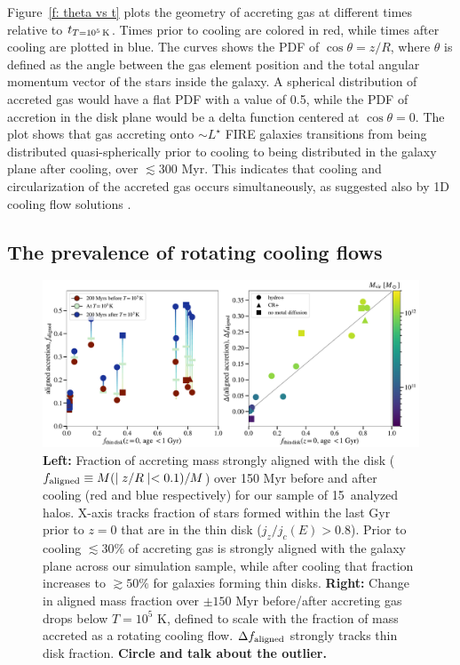 \documentclass[fleqn,usenatbib]{mnras}
\newcommand{\tcon}{t_{T=10^5\,{\rm K}}}
\newcommand{\Nsample}{15}
\begin{document}
Figure~\ref{f: theta vs t} plots the geometry of accreting gas at different times relative to $\tcon$.
Times prior to cooling are colored in red, while times after cooling are plotted in blue.
The curves shows the PDF of $\cos \theta = z/R$, where $\theta$ is defined as the angle between the gas element position and the total angular momentum vector of the stars inside the galaxy.
A spherical distribution of accreted gas would have a flat PDF with a value of 0.5, while 
the PDF of accretion in the disk plane would be a delta function centered at $\cos\theta = 0$.
The plot shows that gas accreting onto $\sim L^\star$ FIRE galaxies transitions from being distributed quasi-spherically prior to cooling to being distributed in the galaxy plane after cooling, over $\lesssim 300$ Myr.
This indicates that cooling and circularization of the accreted gas occurs simultaneously, as suggested also by 1D cooling flow solutions \citep{Stern2020}.

\subsection{The prevalence of rotating cooling flows}
\label{s: prevalence}

\begin{figure}
    \centering
    \includegraphics[width=\textwidth]{figures/prevalence/aligned_fraction.pdf}
    \caption{
    \textbf{Left:}
    Fraction of accreting mass strongly aligned with the disk ($f_{\rm aligned} \equiv M(\mid z/R \mid < 0.1)/M$) over 150 Myr before and after cooling (red and blue respectively) for our sample of \Nsample~analyzed halos.
    X-axis tracks fraction of stars formed within the last Gyr prior to $z=0$ that are in the thin disk ($j_z/j_c(E)>0.8$).
    Prior to cooling $\lesssim 30\%$ of accreting gas is strongly aligned with the galaxy plane across our simulation sample,
    while after cooling that fraction increases to $\gtrsim 50\%$ for galaxies forming thin disks.
    \textbf{Right:}
    Change in aligned mass fraction over $\pm 150$ Myr before/after accreting gas drops below $T = 10^5$ K, defined to scale with the fraction of mass accreted as a rotating cooling flow.
    $\Delta f_{\rm aligned}$ strongly tracks thin disk fraction.
    \textbf{Circle and talk about the outlier.}
    }
    \label{f: prevalence}
\end{figure}
\end{document}
